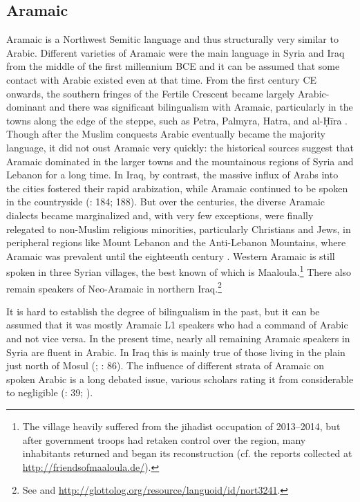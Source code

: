 \documentclass[output=paper]{langsci/langscibook}
\begin{document}
  \subsection{Aramaic} \label{aram}
Aramaic is a Northwest Semitic language and thus structurally very similar to Arabic. Different varieties of Aramaic were the main language in Syria and Iraq from the middle of the first millennium BCE and it can be assumed that some contact with Arabic existed even at that time. From the first century CE onwards, the southern fringes of the Fertile Crescent became largely Arabic-dominant and there was significant bilingualism with Aramaic, particularly in the towns along the edge of the steppe, such as Petra, Palmyra, Hatra, and al-Ḥīra \citep[260--262]{Procházka2018Fertile}. Though after the Muslim conquests Arabic eventually became the majority language, it did not oust Aramaic very quickly: the historical sources suggest that Aramaic dominated in the larger towns and the mountainous regions of Syria and Lebanon for a long time. In Iraq, by contrast, the massive influx of Arabs into the cities fostered their rapid arabization, while Aramaic continued to be spoken in the countryside (\citealt{Magidow2013}: 184; 188). But over the centuries, the diverse Aramaic dialects became marginalized and, with very few exceptions, were finally relegated to non-Muslim religious minorities, particularly Christians and Jews, in peripheral regions like Mount Lebanon and the Anti-Lebanon Mountains, where Aramaic was prevalent until the eighteenth century \citep{Retsö2011}. Western Aramaic is still spoken in three Syrian villages, the best known of which is Maaloula.\footnote{The village heavily suffered from the jihadist occupation of 2013--2014, but after government troops had retaken control over the region, many inhabitants returned and began its reconstruction (cf. the reports collected at \url{http://friendsofmaaloula.de/}).} There also remain speakers of Neo-Aramaic in northern Iraq.\footnote{See \citet{Coghill2015} and \url{http://glottolog.org/resource/languoid/id/nort3241}.} 

It is hard to establish the degree of bilingualism in the past, but it can be assumed that it was mostly Aramaic L1 speakers who had a command of Arabic and not vice versa. In the present time, nearly all remaining Aramaic speakers in Syria are fluent in Arabic. In Iraq this is mainly true of those living in the plain just north of Mosul (\citealt{ArnoldBehnstedt1993}; \citealt{Coghill2015}: 86). The influence of different strata of Aramaic on spoken Arabic is a long debated issue, various scholars rating it from considerable to negligible (\citealt{Hopkins1995}: 39; \citealt{Lentin2018}).
\end{document}
